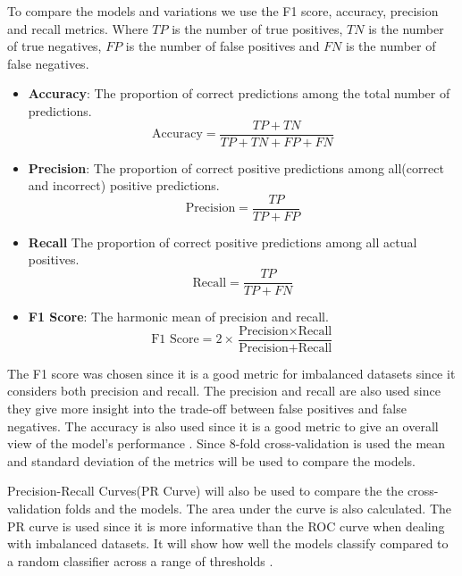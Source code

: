 To compare the models and variations we use the F1 score, accuracy, precision and recall metrics. Where $TP$ is the number of true positives, $TN$ is the number of true negatives, $FP$ is the number of false positives and $FN$ is the number of false negatives. \cite{Marsland2015}

\vspace{0.2cm}

\begin{itemize}
  \item \textbf{Accuracy}: The proportion of correct predictions among the total number of predictions.
  \begin{equation}
      \text{Accuracy} = \frac{TP + TN}{TP + TN + FP + FN}
  \end{equation}

  \item \textbf{Precision}: The proportion of correct positive predictions among all(correct and incorrect) positive predictions.
  \begin{equation}
      \text{Precision} = \frac{TP}{TP + FP}
  \end{equation}

  \item \textbf{Recall} The proportion of correct positive predictions among all actual positives.
  \begin{equation}
      \text{Recall} = \frac{TP}{TP + FN}
  \end{equation}

  \item \textbf{F1 Score}: The harmonic mean of precision and recall.
  \begin{equation}
      \text{F1 Score} = 2 \times \frac{\text{Precision} \times \text{Recall}}{\text{Precision} + \text{Recall}}
  \end{equation}
\end{itemize}

The F1 score was chosen since it is a good metric for imbalanced datasets since it considers both precision and recall. The precision and recall are also used since they give more insight into the trade-off between false positives and false negatives. The accuracy is also used since it is a good metric to give an overall view of the model's performance \cite{Brownlee2020_imbalanced_metrics}. Since 8-fold cross-validation is used the mean and standard deviation of the metrics will be used to compare the models.

Precision-Recall Curves(PR Curve) will also be used to compare the the cross-validation folds and the models. The area under the curve is also calculated. The PR curve is used since it is more informative than the ROC curve when dealing with imbalanced datasets. It will show how well the models classify compared to a random classifier across a range of thresholds \cite{scikit_learn_precision_recall}.

